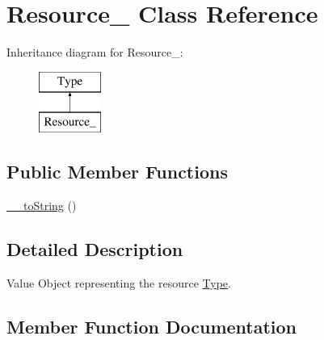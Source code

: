 \hypertarget{classphp_documentor_1_1_reflection_1_1_types_1_1_resource__}{}\section{Resource\+\_\+ Class Reference}
\label{classphp_documentor_1_1_reflection_1_1_types_1_1_resource__}
Inheritance diagram for Resource\+\_\+\+:\begin{figure}[H]
\begin{center}
\leavevmode
\includegraphics[height=2.000000cm]{classphp_documentor_1_1_reflection_1_1_types_1_1_resource__}
\end{center}
\end{figure}
\subsection*{Public Member Functions}
\begin{DoxyCompactItemize}
\item 
\mbox{\hyperlink{classphp_documentor_1_1_reflection_1_1_types_1_1_resource___a7516ca30af0db3cdbf9a7739b48ce91d}{\+\_\+\+\_\+to\+String}} ()
\end{DoxyCompactItemize}


\subsection{Detailed Description}
Value Object representing the \textquotesingle{}resource\textquotesingle{} \mbox{\hyperlink{interfacephp_documentor_1_1_reflection_1_1_type}{Type}}. 

\subsection{Member Function Documentation}
\mbox{\label{classphp_documentor_1_1_reflection_1_1_types_1_1_resource___a7516ca30af0db3cdbf9a7739b48ce91d}} 
